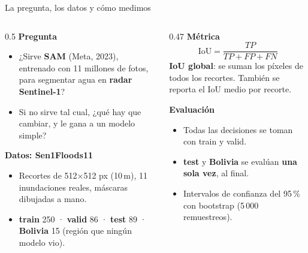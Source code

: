 \documentclass[10pt,aspectratio=1610]{beamer}
\begin{document}
\begin{frame}{La pregunta, los datos y cómo medimos}
  \begin{columns}[T]
    \begin{column}{0.5\textwidth}
      \textbf{Pregunta}
      \begin{itemize}\small
        \item ¿Sirve \textbf{SAM} (Meta, 2023), entrenado con 11 millones de fotos, para segmentar agua en \textbf{radar Sentinel-1}?
        \item Si no sirve tal cual, ¿qué hay que cambiar, y le gana a un modelo simple?
      \end{itemize}
      \textbf{Datos: Sen1Floods11}
      \begin{itemize}\small
        \item Recortes de 512$\times$512 px (10\,m), 11 inundaciones reales, máscaras dibujadas a mano.
        \item \textbf{train} 250 · \textbf{valid} 86 · \textbf{test} 89 · \textbf{Bolivia} 15 (región que ningún modelo vio).
      \end{itemize}
    \end{column}
    \begin{column}{0.47\textwidth}
      \textbf{Métrica}
      \[ \text{IoU} = \frac{TP}{TP+FP+FN} \]
      {\small \textbf{IoU global}: se suman los píxeles de todos los recortes. También se reporta el IoU medio por recorte.}

      \medskip
      \textbf{Evaluación}
      \begin{itemize}\small
        \item Todas las decisiones se toman con train y valid.
        \item \textbf{test} y \textbf{Bolivia} se evalúan \textbf{una sola vez}, al final.
        \item Intervalos de confianza del 95\,\% con bootstrap (5\,000 remuestreos).
      \end{itemize}
    \end{column}
  \end{columns}
\end{frame}
\end{document}
